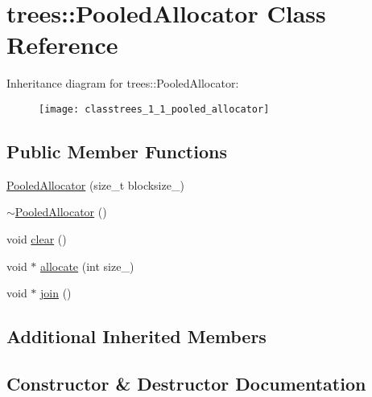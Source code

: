 \hypertarget{classtrees_1_1_pooled_allocator}{}\section{trees\+:\+:Pooled\+Allocator Class Reference}
\label{classtrees_1_1_pooled_allocator}
Inheritance diagram for trees\+:\+:Pooled\+Allocator\+:\begin{figure}[H]
\begin{center}
\leavevmode
\texttt{[image: classtrees\_1\_1\_pooled\_allocator]}
\end{center}
\end{figure}
\subsection*{Public Member Functions}
\begin{DoxyCompactItemize}
\item 
\hyperlink{classtrees_1_1_pooled_allocator_ac29cfd7073171cf67cf0e78a37f9edac}{Pooled\+Allocator} (size\+\_\+t blocksize\+\_)
\item 
\hyperlink{classtrees_1_1_pooled_allocator_a02a16650ef941629896065e047542c9b}{$\sim$\+Pooled\+Allocator} ()
\item 
void \hyperlink{classtrees_1_1_pooled_allocator_aeaf5da95ab275fed2865de00801e79b2}{clear} ()
\item 
void $\ast$ \hyperlink{classtrees_1_1_pooled_allocator_a96e389f45a528f153f7518dbe807c1d6}{allocate} (int size\+\_\+)
\item 
void $\ast$ \hyperlink{classtrees_1_1_pooled_allocator_a48598296a62c31931cbcd1d8fb61f43f}{join} ()
\end{DoxyCompactItemize}
\subsection*{Additional Inherited Members}


\subsection{Constructor \& Destructor Documentation}
\mbox{\label{classtrees_1_1_pooled_allocator_ac29cfd7073171cf67cf0e78a37f9edac}} 
